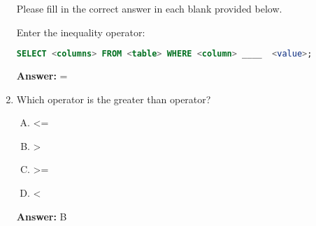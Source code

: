 \documentclass[12pt]{article}
\begin{document}
\begin{enumerate}[1.]
    Please fill in the correct answer in each blank provided below.

    \bigskip

    Enter the inequality operator:

    \bigskip

    \begin{lstlisting}[language=SQL]
    SELECT <columns> FROM <table> WHERE <column> ____  <value>;
    \end{lstlisting}

    \bigskip

    \textbf{Answer:} =

    \item

    Which operator is the greater than operator?

    \bigskip

    \begin{enumerate}[A.]
        \item <=
        \item >
        \item >=
        \item <
    \end{enumerate}

    \bigskip

    \textbf{Answer:} B


\end{enumerate}
\end{document}
